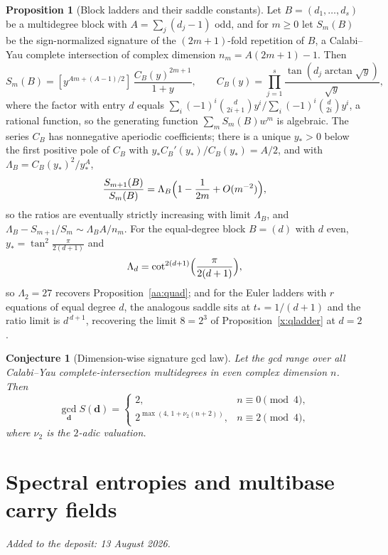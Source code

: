 \documentclass[11pt]{article}
\newtheorem{conjecture}{Conjecture}
\theoremstyle{definition}
\newtheorem{proposition}{Proposition}
\begin{document}
\begin{proposition}[Block ladders and their saddle constants]\label{aa:blocks}
Let $B=(d_1,\ldots,d_s)$ be a multidegree block with $A=\sum_j(d_j-1)$ odd, and for $m\ge0$ let $S_m(B)$ be the sign-normalized signature of the $(2m+1)$-fold repetition of $B$, a Calabi--Yau complete intersection of complex dimension $n_m=A(2m+1)-1$.  Then
\[
S_m(B)=[y^{Am+(A-1)/2}]\,\frac{C_B(y)^{2m+1}}{1+y},
\qquad
C_B(y)=\prod_{j=1}^s\frac{\tan(d_j\arctan\sqrt y)}{\sqrt y},
\]
where the factor with entry $d$ equals $\sum_i(-1)^i\binom{d}{2i+1}y^i\big/\sum_i(-1)^i\binom{d}{2i}y^i$, a rational function, so the generating function $\sum_mS_m(B)w^m$ is algebraic.  The series $C_B$ has nonnegative aperiodic coefficients; there is a unique $y_{*}>0$ below the first positive pole of $C_B$ with $y_{*}C_B'(y_{*})/C_B(y_{*})=A/2$, and with $\Lambda_B=C_B(y_{*})^2/y_{*}^A$,
\[
\frac{S_{m+1}(B)}{S_m(B)}=\Lambda_B\Bigl(1-\frac1{2m}+O(m^{-2})\Bigr),
\]
so the ratios are eventually strictly increasing with limit $\Lambda_B$, and $\Lambda_B-S_{m+1}/S_m\sim\Lambda_BA/n_m$.  For the equal-degree block $B=(d)$ with $d$ even, $y_{*}=\tan^2\tfrac{\pi}{2(d+1)}$ and
\[
\Lambda_d=\cot^{2(d+1)}\Bigl(\frac{\pi}{2(d+1)}\Bigr),
\]
so $\Lambda_2=27$ recovers Proposition~\ref{aa:quad}; and for the Euler ladders with $r$ equations of equal degree $d$, the analogous saddle sits at $t_{*}=1/(d+1)$ and the ratio limit is $d^{\,d+1}$, recovering the limit $8=2^3$ of Proposition~\ref{x:qladder} at $d=2$.
\end{proposition}

\begin{conjecture}[Dimension-wise signature gcd law]\label{aa20}
Let the gcd range over all Calabi--Yau complete-intersection multidegrees in even complex dimension $n$.  Then
\[
\gcd_{\mathbf d}S(\mathbf d)=
\begin{cases}
2,&n\equiv0\pmod4,\\
2^{\max(4,\,1+\nu_2(n+2))},&n\equiv2\pmod4,
\end{cases}
\]
where $\nu_2$ is the $2$-adic valuation.
\end{conjecture}

\part{Spectral entropies and multibase carry fields}

\medskip\noindent\emph{Added to the deposit: 13 August 2026.}\par\medskip
\end{document}

